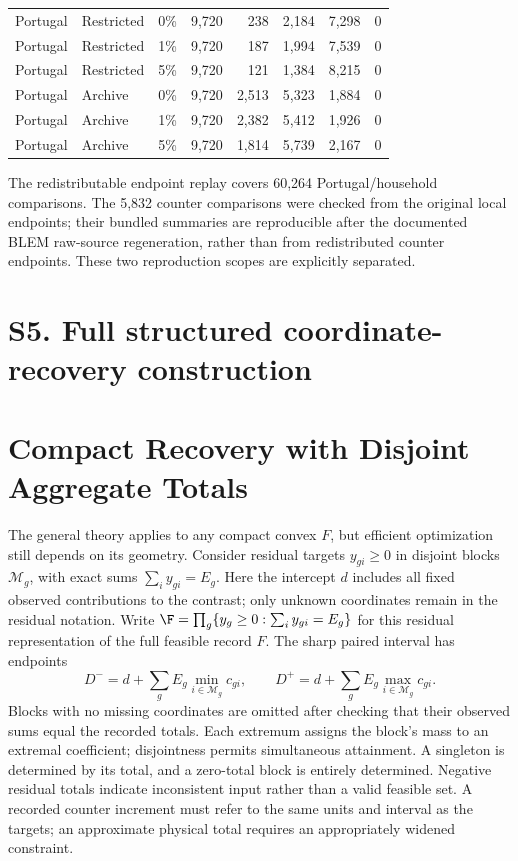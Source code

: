 \begin{table}[htbp]
\begin{tabular}{lllrrrrr}
Portugal & Restricted & 0\% & 9,720 & 238 & 2,184 & 7,298 & 0 \\
Portugal & Restricted & 1\% & 9,720 & 187 & 1,994 & 7,539 & 0 \\
Portugal & Restricted & 5\% & 9,720 & 121 & 1,384 & 8,215 & 0 \\
Portugal & Archive & 0\% & 9,720 & 2,513 & 5,323 & 1,884 & 0 \\
Portugal & Archive & 1\% & 9,720 & 2,382 & 5,412 & 1,926 & 0 \\
Portugal & Archive & 5\% & 9,720 & 1,814 & 5,739 & 2,167 & 0 \\
\bottomrule
\end{tabular}
\end{table}
\FloatBarrier
The redistributable endpoint replay covers 60,264 Portugal/household
comparisons. The 5,832 counter comparisons were checked from the original
local endpoints; their bundled summaries are reproducible after the
documented BLEM raw-source regeneration, rather than from redistributed
counter endpoints. These two reproduction scopes are explicitly separated.

\section{S5. Full structured coordinate-recovery construction}
\section{Compact Recovery with Disjoint Aggregate Totals}
\label{sec:structured}
The general theory applies to any compact convex $F$, but efficient
optimization still depends on its geometry. Consider residual targets
$y_{gi}\geq0$ in disjoint blocks $\mathcal M_g$, with exact sums
$\sum_i y_{gi}=E_g$. Here the intercept $d$ includes all fixed observed
contributions to the contrast; only unknown coordinates remain in the
residual notation. Write
$\F=\prod_g\{y_g\geq0:\sum_i y_{gi}=E_g\}$ for this residual
representation of the full feasible record $F$. The sharp paired interval has endpoints
\begin{equation}
 D^-=d+\sum_g E_g\min_{i\in\mathcal M_g}c_{gi},\qquad
 D^+=d+\sum_g E_g\max_{i\in\mathcal M_g}c_{gi}.
 \label{eq:sharp}
\end{equation}
Blocks with no missing coordinates are omitted after checking that their
observed sums equal the recorded totals.
Each extremum assigns the block's mass to an extremal coefficient;
disjointness permits simultaneous attainment. A singleton is determined
by its total, and a zero-total block is entirely determined. Negative
residual totals indicate inconsistent input rather than a valid feasible
set. A recorded counter increment must refer to the same units and
interval as the targets; an approximate physical total requires an
appropriately widened constraint.


